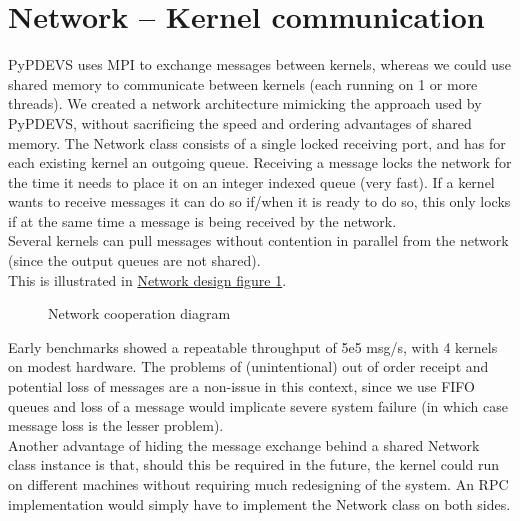 \documentclass[8pt,a4paper]{report}
\begin{document}
\section{Network -- Kernel communication}
PyPDEVS uses MPI to exchange messages between kernels, whereas we could use shared memory to communicate between kernels (each running on 1 or more threads). We created a network architecture mimicking the approach used by PyPDEVS, without sacrificing the speed and ordering advantages of shared memory. The Network class consists of a single locked receiving port, and has for each existing kernel an outgoing queue. Receiving a message locks the network for the time it needs to place it on an integer indexed queue (very fast). If a kernel wants to receive messages it can do so if/when it is ready to do so, this only locks if at the same time a message is being received by the network.\\ Several kernels can pull messages without contention in parallel from the network (since the output queues are not shared). \\This is illustrated in \hyperref[networkdesign]{Network design figure \ref*{networkdesign}}.

\begin{figure}[h!]
	\caption{Network cooperation diagram}
	\label{networkdesign}
\end{figure} 
Early benchmarks showed a repeatable throughput of 5e5 msg/s, with 4 kernels on modest hardware. The problems of (unintentional) out of order receipt and potential loss of messages are a non-issue in this context, since we use FIFO queues and loss of a message would implicate severe system failure (in which case message loss is the lesser problem).\\
Another advantage of hiding the message exchange behind a shared Network class instance is that, should this be required in the future, the kernel could run on different machines without requiring much redesigning of the system. An RPC implementation would simply have to implement the Network class on both sides.
\end{document}
